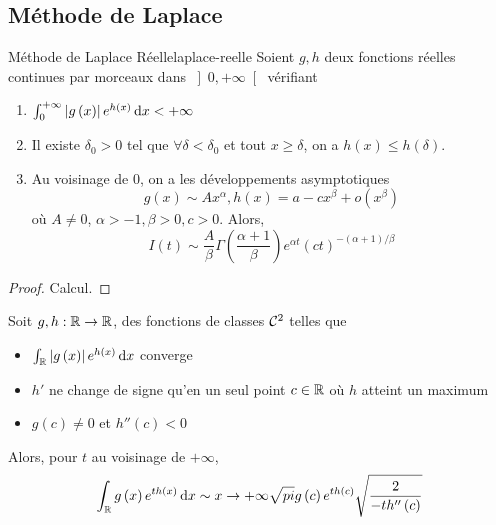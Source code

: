 \documentclass{cours}
\begin{document}
\subsection{Méthode de Laplace}
\begin{théorème}
	{Méthode de Laplace Réelle}{laplace-reelle}
Soient $g, h$ deux fonctions réelles continues par morceaux dans $\left]0, +\infty\right[$ vérifiant
	\begin{enumerate}
		\item $\int_{0}^{+\infty} \left|g\left(x\right)\right|e^{h\left(x\right)}{\rm \, d} x < +\infty$
		\item Il existe $\delta_{0} > 0$ tel que $\forall \delta < \delta_{0}$ et tout $x \geq \delta$, on a $h\left(x\right) \leq h\left(\delta\right)$.
		\item Au voisinage de $0$, on a les développements asymptotiques
			\begin{equation*}
				g\left(x\right) \sim Ax^{\alpha}, h\left(x\right) = a - cx^{\beta} + o\left(x^{\beta}\right)
			\end{equation*}
			où $A \neq 0$, $\alpha > -1, \beta > 0, c > 0$.
			Alors, 
			\begin{equation*}
				I\left(t\right) \sim \frac{A}{\beta}\Gamma\left(\frac{\alpha + 1}{\beta}\right)e^{\alpha t}\left(ct\right)^{-\left(\alpha + 1\right)/\beta}
			\end{equation*}
	\end{enumerate}
\end{théorème}
\begin{proof}
	Calcul.
\end{proof}


\begin{corollaire}
	{}{}
	Soit $g, h : \mathbb{R} \to \mathbb{R}$, des fonctions de classes $\mathcal{C}^{2}$ telles que 
	\begin{itemize}
		\item $\int_{\mathbb{R}}\left|g\left(x\right)\right|e^{h\left(x\right)}{\rm \, d} x$ converge
		\item $h'$ ne change de signe qu'en un seul point $c \in \mathbb{R}$ où $h$ atteint un maximum
		\item $g\left(c\right) \neq 0$ et $h''\left(c\right) < 0$
	\end{itemize}
	Alors, pour $t$ au voisinage de $+ \infty$, 
	\begin{equation*}
		\int_{\mathbb{R}}g\left(x\right)e^{th\left(x\right)}{\rm \, d} x \sim{x \to + \infty} \sqrt{pi}g\left(c\right)e^{th\left(c\right)}\sqrt{\frac{2}{-th''\left(c\right)}}
	\end{equation*}
\end{corollaire}
\end{document}
